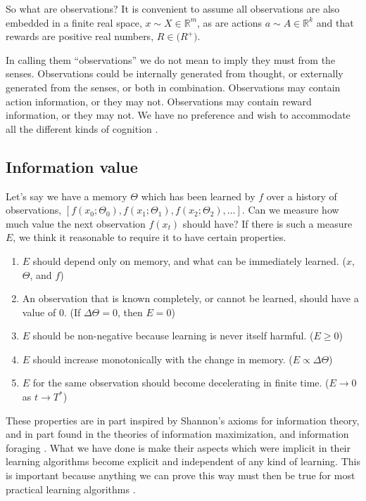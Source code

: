 So what are observations? It is convenient to assume all observations are also embedded in a finite real space, $x \sim X \in \mathbb{R}^m$, as are actions $a \sim A \in \mathbb{R}^k$ and that rewards are positive real numbers, $R \in \mathbb(R^{+})$. 

In calling them ``observations'' we do not mean to imply they must from the senses. Observations could be internally generated from thought, or externally generated from the senses, or both in combination. Observations may contain action information, or they may not. Observations may contain reward information, or they may not. We have no preference and wish to accommodate all the different kinds of cognition \cite{needed}. %

\subsection{Information value} 
Let's say we have a memory $\Theta$ which has been learned by $f$ over a history of observations, $[f(x_0; \Theta_0), f(x_1; \Theta_1), f(x_2; \Theta_2), \ldots]$. Can we measure how much value the next observation $f(x_t)$ should have? If there is such a measure $E$, we think it reasonable to require it to have certain properties.

\begin{enumerate}
	\item $E$ should depend only on memory, and what can be immediately learned. ($x$, $\Theta$, and $f$)
	\item An observation that is known completely, or cannot be learned, should have a value of 0. (If $\Delta \Theta = 0$, then $E=0$)
	\item $E$ should be non-negative because learning is never itself harmful. ($E \ge 0$)
	\item $E$ should increase monotonically with the change in memory. ($E \propto \Delta \Theta$)
	\item $E$ for the same observation should become decelerating in finite time. ($E \rightarrow 0$ as $t \rightarrow T^*$)
\end{enumerate}

These properties are in part inspired by Shannon's axioms for information theory, and in part found in the theories of information maximization, and information foraging \cite{needed}. What we have done is make their aspects which were implicit in their learning algorithms become explicit and independent of any kind of learning. This is important because anything we can prove this way must then be true for most practical learning algorithms \cite{MacKay2003}. 


